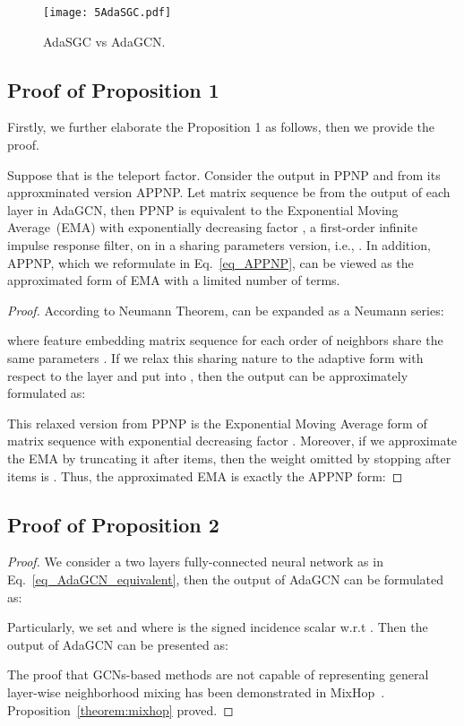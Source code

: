 \documentclass{article} \usepackage{iclr2021_conference,times}
\begin{document}
\begin{figure}[htbp]
	\centering
	\centering\texttt{[image: 5AdaSGC.pdf]}
	\caption{AdaSGC vs AdaGCN.}
	\label{figure_AdaSGC}
\end{figure}


\subsection{Proof of Proposition 1} \label{sec: proof_theorem1}
Firstly, we further elaborate the Proposition 1 as follows, then we provide the proof.

Suppose that  is the teleport factor. Consider the output  in PPNP and  from its approxminated version APPNP. Let matrix sequence  be from the output of each layer  in AdaGCN, then PPNP is equivalent to the Exponential Moving Average~(EMA) with exponentially decreasing factor , a first-order infinite impulse response filter, on  in a sharing parameters version, i.e., . In addition, APPNP, which we reformulate in Eq.~\ref{eq_APPNP}, can be viewed as the approximated form of EMA with a limited number of terms. 


\begin{proof}
	According to Neumann Theorem,  can be expanded as a Neumann series:
	
	where feature embedding matrix sequence  for each order of neighbors share the same parameters . If we relax this sharing nature to the adaptive form with respect to the layer and put  into , then the output  can be approximately formulated as:
	
	This relaxed version from PPNP is the Exponential Moving Average form of matrix sequence  with exponential decreasing factor . Moreover, if we approximate the EMA by truncating it after  items, then the weight omitted by stopping after  items is . Thus, the approximated EMA is exactly the APPNP form:
	
\end{proof}

\subsection{Proof of Proposition 2} \label{sec: proof_theorem2}

\begin{proof}
	We consider a two layers fully-connected neural network as  in Eq.~\ref{eq_AdaGCN_equivalent}, then the output of AdaGCN can be formulated as:
	
	Particularly, we set  and  where  is the signed incidence scalar w.r.t . Then the output of AdaGCN can be presented as:
	
	The proof that GCNs-based methods are not capable of representing general layer-wise neighborhood mixing has been demonstrated in MixHop~\citep{abu2019mixhop}. Proposition~\ref{theorem:mixhop} proved.
\end{proof}
\end{document}
